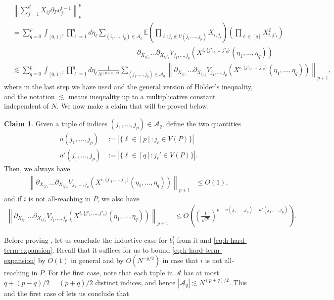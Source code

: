 \documentclass{article}
\newcommand{\1}{\mathbbm{1}}
\newcommand{\norm}[1]{\left\lVert#1\right\rVert}
\theoremstyle{plain}
\theoremstyle{definition}
\newtheorem{claim}[theorem]{Claim}
\theoremstyle{remark}
\newcommand{\E}{\mathbb{E}}
\newcommand{\calA}{\mathcal{A}}
\begin{document}
\begin{align}
    &\norm{\sum_{j=1}^d X_{ij}\partial_P v_j^{t-1}}_p^p \nonumber\\
    &= \sum_{q=0}^p \int_{[0,1]^q} \prod_{\ell=1}^q d\eta_\ell\sum_{(i_1,\dots,i_p) \in \calA_q} \E\left(\prod_{\ell: j_\ell \notin U(j_1,\dots,j_p)} X_{i,j_\ell}\right) \left(\prod_{\ell\in [q]} X_{i,j'_\ell}^2\right) \nonumber\\
    &\qquad \qquad \qquad \qquad \qquad \qquad \qquad\qquad \qquad\partial_{X_{ij'_1}}\dots \partial_{X_{ij'_q}} V_{j_1,\dots,j_p}(X^{i,\{j'_1,\dots,j'_q\}}(\eta_1,\dots,\eta_q))\nonumber \\
    &\lesssim  \sum_{q=0}^p \int_{[0,1]^q} \prod_{\ell=1}^q d\eta_\ell\frac{1}{N^{(p+q)/2}}\sum_{(j_1,\dots,j_p) \in \calA_q} \norm{\partial_{X_{ij'_1}}\dots \partial_{X_{ij'_q}} V_{j_1,\dots,j_p}(X^{i,\{j'_1,\dots,j'_q\}}(\eta_1,\dots,\eta_q))}_{p+1}, \label{eq:h-hard-term-expansion}
\end{align}
where in the last step we have used  and the general version of Hölder's inequality, and the notation $\lesssim$ means inequality up to a multiplicative constant independent of $N.$ We now make a claim that will be proved below.
\begin{claim}\label{claim:in-h-induction}
    Given a tuple of indices $(j_1,\dots,j_p) \in \calA_q$, define the two quantities
    \begin{align*}
        u(j_1,\dots,j_p) &:= |\{\ell \in [p] : j_\ell \in V(P)\}| \\
        u'(j_1,\dots,j_p) &:= |\{\ell \in [q] : j_\ell' \in V(P)\}|.
    \end{align*}
    Then, we always have 
    \begin{align}
        \norm{\partial_{X_{ij'_1}}\dots \partial_{X_{ij'_q}} V_{j_1,\dots,j_p}(X^{i,\{j'_1,\dots,j'_q\}}(\eta_1,\dots,\eta_q))}_{p+1} &\leq O(1), \label{eq:claim-in-h-induction-O1}
    \end{align}
    and if $i$ is not all-reaching in $P$, we also have 
    \begin{align}
        \norm{\partial_{X_{ij'_1}}\dots \partial_{X_{ij'_q}} V_{j_1,\dots,j_p}(X^{i,\{j'_1,\dots,j'_q\}}(\eta_1,\dots,\eta_q))}_{p+1} &\leq O\left(\left(\frac{1}{\sqrt{N}}\right)^{p - u(j_1,\dots,j_p) - u'(j_1,\dots,j_p)}\right).\label{eq:claim-in-h-induction-OsqrtN}
    \end{align}
\end{claim}
Before proving , let us conclude the inductive case for $b_i^t$ from it and \eqref{eq:h-hard-term-expansion}. Recall that it suffices for us to bound \eqref{eq:h-hard-term-expansion} by $O(1)$ in general and by $O( N^{-p/2})$ in case that $i$ is not all-reaching in $P$. For the first case, note that each tuple in $\calA$ has at most $q + (p-q)/2 = (p+q)/2$ distinct indices, and hence $|\calA_q|\lesssim N^{(p+q)/2}.$ This and the first case of  lets us conclude that
\end{document}
